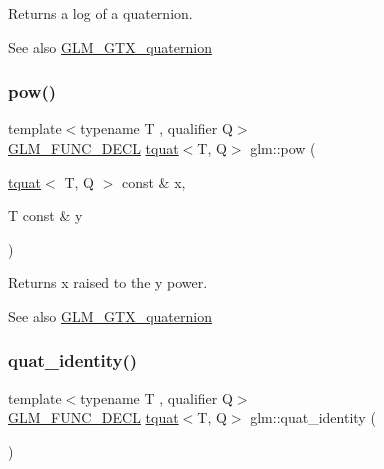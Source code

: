 Returns a log of a quaternion.

\begin{DoxySeeAlso}{See also}
\hyperlink{group__gtx__quaternion}{G\+L\+M\+\_\+\+G\+T\+X\+\_\+quaternion} 
\end{DoxySeeAlso}
\mbox{\label{group__gtx__quaternion_gad382fc37392d537aecf2245a4597d8a3}} 
\subsubsection{\texorpdfstring{pow()}{pow()}}
{\footnotesize\ttfamily template$<$typename T , qualifier Q$>$ \\
\hyperlink{setup_8hpp_ab2d052de21a70539923e9bcbf6e83a51}{G\+L\+M\+\_\+\+F\+U\+N\+C\+\_\+\+D\+E\+CL} \hyperlink{structglm_1_1tquat}{tquat}$<$T, Q$>$ glm\+::pow (\begin{DoxyParamCaption}\item[{\hyperlink{structglm_1_1tquat}{tquat}$<$ T, Q $>$ const \&}]{x,  }\item[{T const \&}]{y }\end{DoxyParamCaption})}

Returns x raised to the y power.

\begin{DoxySeeAlso}{See also}
\hyperlink{group__gtx__quaternion}{G\+L\+M\+\_\+\+G\+T\+X\+\_\+quaternion} 
\end{DoxySeeAlso}
\mbox{\label{group__gtx__quaternion_ga40788ce1d74fac29fa000af893a3ceb5}} 
\subsubsection{\texorpdfstring{quat\+\_\+identity()}{quat\_identity()}}
{\footnotesize\ttfamily template$<$typename T , qualifier Q$>$ \\
\hyperlink{setup_8hpp_ab2d052de21a70539923e9bcbf6e83a51}{G\+L\+M\+\_\+\+F\+U\+N\+C\+\_\+\+D\+E\+CL} \hyperlink{structglm_1_1tquat}{tquat}$<$T, Q$>$ glm\+::quat\+\_\+identity (\begin{DoxyParamCaption}{ }\end{DoxyParamCaption})}

